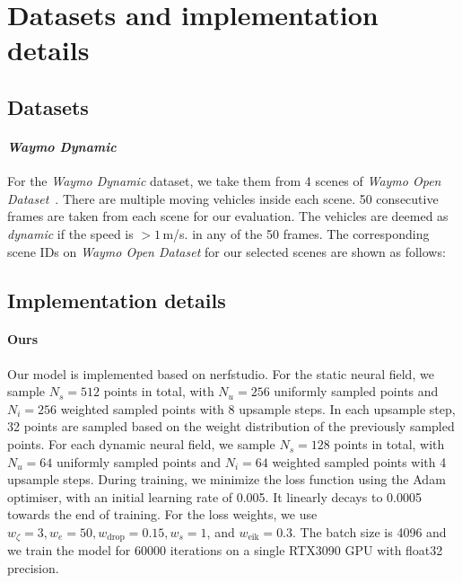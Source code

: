 \section{Datasets and implementation details}\label{sec:sup_dataset}
\subsection{Datasets}
\paragraph{\textit{Waymo Dynamic}} For the \textit{Waymo Dynamic} dataset, we take them from 4 scenes of \textit{Waymo Open Dataset}~\cite{sun2020scalability}. There are multiple moving vehicles inside each scene. 50 consecutive frames are taken from each scene for our evaluation. The vehicles are deemed as \textit{dynamic} if the speed is $>1\,$m/s. in any of the 50 frames. The corresponding scene IDs on \textit{Waymo Open Dataset} for our selected scenes are shown as follows:
\begin{table}[!h]
    \setlength{\tabcolsep}{4pt}
    \renewcommand{\arraystretch}{1.2}
	\centering
\end{table}

\subsection{Implementation details}
\paragraph{Ours} 
Our model is implemented based on nerfstudio\cite{nerfstudio}. For the static neural field, we sample $N_s=512$ points in total, with $N_u=256$ uniformly sampled points and $N_i=256$ weighted sampled points with 8 upsample steps. In each upsample step, 32 points are sampled based on the weight distribution of the previously sampled points. For each dynamic neural field, we sample $N_s=128$ points in total, with $N_u=64$ uniformly sampled points and $N_i=64$ weighted sampled points with 4 upsample steps. During training, we minimize the loss function using the Adam~\cite{kingma2014adam} optimiser, with an initial learning rate of 0.005. It linearly decays to 0.0005 towards the end of training. For the loss weights, we use $w_{\zeta}=3, w_{e}=50, w_{\text{drop}}=0.15, w_{s}=1$, and  $w_{\text{eik}}=0.3$. The batch size is 4096 and we train the model for 60000 iterations on a single RTX3090 GPU with float32 precision.

